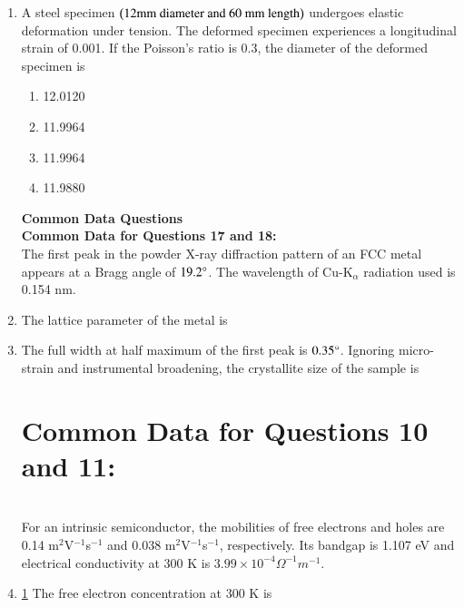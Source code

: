 \documentclass[journal]{IEEEtran}
\begin{document}
\begin{enumerate}
\item A steel specimen $\left(12 \text{mm diameter and}\ 60 \ \text{mm length}\right)$ undergoes elastic deformation under tension. The deformed specimen experiences a longitudinal strain of 0.001. If the Poisson's ratio is 0.3, the diameter of the deformed specimen  is 
\begin{multicols}{4}
\begin{enumerate}
    \item 12.0120
    \item 11.9964
    \item 11.9964
    \item 11.9880
\end{enumerate}
\end{multicols}

\textbf{Common Data Questions}\\
\textbf{Common Data for Questions 17 and 18:}\\
 The first peak in the powder X-ray diffraction pattern of an FCC metal appears at a Bragg angle of $19.2\degree$. The wavelength of Cu-K$_{\alpha}$ radiation used is 0.154 nm.\\
\item The lattice parameter of the metal  is
\begin{enumerate}
\end{enumerate}


\item The full width at half maximum  of the first peak is $0.35\degree$.
 Ignoring micro-strain and instrumental broadening, the crystallite size of the sample  is 
\begin{enumerate}
\end{enumerate}

\section{\textbf{Common Data for Questions 10 and 11:}}\label{common_data}\\
For an intrinsic semiconductor, the mobilities of free electrons and holes are 0.14 m$^{2}$V$^{-1}$s$^{-1}$
 and 0.038 m$^{2}$V$^{-1}$s$^{-1}$, respectively. Its bandgap is 1.107 eV and electrical conductivity at 300 K is $3.99 \times 10^{-4} \Omega ^{-1}m^{-1}$.  \\
\item\ref{common_data} The free electron concentration  at 300 K is


\end{enumerate}
\end{document}
